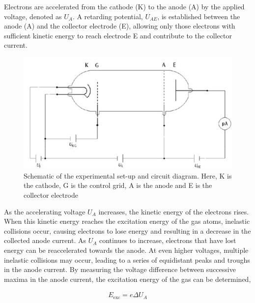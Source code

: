 Electrons are accelerated from the cathode (K) to the anode (A) by the applied voltage, denoted as $U_A$. A retarding potential, $U_{AE}$, is established between the anode (A) and the collector electrode (E), allowing only those electrons with sufficient kinetic energy to reach electrode E and contribute to the collector current.

\begin{figure}[H]
    \centering
    \includegraphics[width=1\columnwidth]{images/f2.png}
    \caption{Schematic of the experimental set-up and circuit diagram. Here, K is the cathode, G is the control grid, A is the anode and E is the collector electrode}
\end{figure}

As the accelerating voltage $U_A$ increases, the kinetic energy of the electrons rises. When this kinetic energy reaches the excitation energy of the gas atoms, inelastic collisions occur, causing electrons to lose energy and resulting in a decrease in the collected anode current. As $U_A$ continues to increase, electrons that have lost energy can be reaccelerated towards the anode. At even higher voltages, multiple inelastic collisions may occur, leading to a series of equidistant peaks and troughs in the anode current. By measuring the voltage difference between successive maxima in the anode current, the excitation energy of the gas can be determined,

\begin{align}
    E_\text{exc} = e\Delta U_A
\end{align}